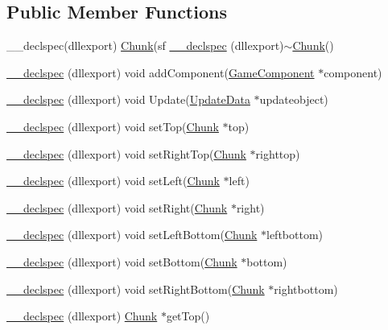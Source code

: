 \subsection*{Public Member Functions}
\begin{DoxyCompactItemize}
\item 
\-\_\-\-\_\-declspec(dllexport) \hyperlink{class_chunk}{Chunk}(sf \hyperlink{class_chunk_ab44ec5e17f0ca6096892265ebf4a448d}{\-\_\-\-\_\-declspec} (dllexport)$\sim$\hyperlink{class_chunk}{Chunk}()
\item 
\hyperlink{class_chunk_ac74827ffc5c989b29d5ee985e0df4e96}{\-\_\-\-\_\-declspec} (dllexport) void add\-Component(\hyperlink{class_game_component}{Game\-Component} $\ast$component)
\item 
\hyperlink{class_chunk_ae878d83d94ede4ee7c565a3825083439}{\-\_\-\-\_\-declspec} (dllexport) void Update(\hyperlink{class_update_data}{Update\-Data} $\ast$updateobject)
\item 
\hyperlink{class_chunk_a27a4e5721687f011d6c52624d01eca8d}{\-\_\-\-\_\-declspec} (dllexport) void set\-Top(\hyperlink{class_chunk}{Chunk} $\ast$top)
\item 
\hyperlink{class_chunk_a164b8ab3a4d2e88b6d1bc5e6edfef100}{\-\_\-\-\_\-declspec} (dllexport) void set\-Right\-Top(\hyperlink{class_chunk}{Chunk} $\ast$righttop)
\item 
\hyperlink{class_chunk_a5e25de330ba7c7c2e557a823d7a8505b}{\-\_\-\-\_\-declspec} (dllexport) void set\-Left(\hyperlink{class_chunk}{Chunk} $\ast$left)
\item 
\hyperlink{class_chunk_ac390d85879176e6e8a26667ba97f8eee}{\-\_\-\-\_\-declspec} (dllexport) void set\-Right(\hyperlink{class_chunk}{Chunk} $\ast$right)
\item 
\hyperlink{class_chunk_a5f6e70225dcd2d5f2cf0c3f77abdfa4b}{\-\_\-\-\_\-declspec} (dllexport) void set\-Left\-Bottom(\hyperlink{class_chunk}{Chunk} $\ast$leftbottom)
\item 
\hyperlink{class_chunk_a69ed23533460c9308dc6ae6e92143e65}{\-\_\-\-\_\-declspec} (dllexport) void set\-Bottom(\hyperlink{class_chunk}{Chunk} $\ast$bottom)
\item 
\hyperlink{class_chunk_a42b5a5cf3a22b7cdd14e5e16f9c74ed0}{\-\_\-\-\_\-declspec} (dllexport) void set\-Right\-Bottom(\hyperlink{class_chunk}{Chunk} $\ast$rightbottom)
\item 
\hyperlink{class_chunk_a023a2a543fc48c2b9ba5d2e31eb42e2a}{\-\_\-\-\_\-declspec} (dllexport) \hyperlink{class_chunk}{Chunk} $\ast$get\-Top()
\item 

\end{DoxyCompactItemize}
